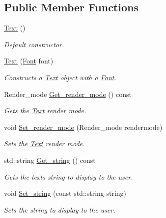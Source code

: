\subsection*{Public Member Functions}
\begin{DoxyCompactItemize}
\item 
\hyperlink{classjetfuel_1_1draw_1_1Text_a8b6aed199242a7c69fda591d8769ced9}{Text} ()
\begin{DoxyCompactList}\small\item\em Default constructor. \end{DoxyCompactList}\item 
\hyperlink{classjetfuel_1_1draw_1_1Text_a792d23b62a66af2558bc7165e5419992}{Text} (\hyperlink{classjetfuel_1_1draw_1_1Font}{Font} font)
\begin{DoxyCompactList}\small\item\em Constructs a \hyperlink{classjetfuel_1_1draw_1_1Text}{Text} object with a \hyperlink{classjetfuel_1_1draw_1_1Font}{Font}. \end{DoxyCompactList}\item 
Render\+\_\+mode \hyperlink{classjetfuel_1_1draw_1_1Text_a35a5ad06ffaf6b6b2f18b0c1b02039ef}{Get\+\_\+render\+\_\+mode} () const
\begin{DoxyCompactList}\small\item\em Gets the \hyperlink{classjetfuel_1_1draw_1_1Text}{Text} render mode. \end{DoxyCompactList}\item 
void \hyperlink{classjetfuel_1_1draw_1_1Text_a428e0511b13deed817144612b5c1f44a}{Set\+\_\+render\+\_\+mode} (Render\+\_\+mode rendermode)
\begin{DoxyCompactList}\small\item\em Sets the \hyperlink{classjetfuel_1_1draw_1_1Text}{Text} render mode. \end{DoxyCompactList}\item 
std\+::string \hyperlink{classjetfuel_1_1draw_1_1Text_aff24355889167e97455750066ff8ded0}{Get\+\_\+string} () const
\begin{DoxyCompactList}\small\item\em Gets the text\textquotesingle{}s string to display to the user. \end{DoxyCompactList}\item 
void \hyperlink{classjetfuel_1_1draw_1_1Text_aaf138731ac6e2ba388df2add9ea15a9a}{Set\+\_\+string} (const std\+::string string)
\begin{DoxyCompactList}\small\item\em Sets the string to display to the user. \end{DoxyCompactList}\item 

\end{DoxyCompactItemize}
